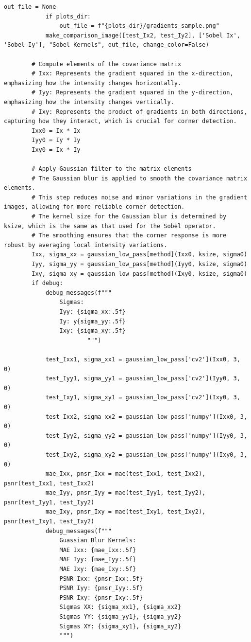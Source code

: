 \documentclass[11pt, conference, letterpaper]{IEEEtran}
\begin{document}
\begin{lstlisting}[style=python, caption={\texttt{shi\_tomasi\_corners.py}}, label={lst:stc}]
            out_file = None
            if plots_dir:
                out_file = f"{plots_dir}/gradients_sample.png"
            make_comparison_image([test_Ix2, test_Iy2], ['Sobel Ix', 'Sobel Iy'], "Sobel Kernels", out_file, change_color=False)
            
        # Compute elements of the covariance matrix
        # Ixx: Represents the gradient squared in the x-direction, emphasizing how the intensity changes horizontally.
        # Iyy: Represents the gradient squared in the y-direction, emphasizing how the intensity changes vertically.
        # Ixy: Represents the product of gradients in both directions, capturing how they interact, which is crucial for corner detection.
        Ixx0 = Ix * Ix
        Iyy0 = Iy * Iy
        Ixy0 = Ix * Iy
    
        # Apply Gaussian filter to the matrix elements
        # The Gaussian blur is applied to smooth the covariance matrix elements. 
        # This step reduces noise and minor variations in the gradient images, allowing for more reliable corner detection. 
        # The kernel size for the Gaussian blur is determined by ksize, which is the same as that used for the Sobel operator. 
        # The smoothing ensures that the corner response is more robust by averaging local intensity variations.
        Ixx, sigma_xx = gaussian_low_pass[method](Ixx0, ksize, sigma0)
        Iyy, sigma_yy = gaussian_low_pass[method](Iyy0, ksize, sigma0)
        Ixy, sigma_xy = gaussian_low_pass[method](Ixy0, ksize, sigma0)
        if debug:
            debug_messages(f"""
                Sigmas: 
                Iyy: {sigma_xx:.5f}
                Iy: y{sigma_yy:.5f}
                Ixy: {sigma_xy:.5f}
                        """)
     
            test_Ixx1, sigma_xx1 = gaussian_low_pass['cv2'](Ixx0, 3, 0)
            test_Iyy1, sigma_yy1 = gaussian_low_pass['cv2'](Iyy0, 3, 0)
            test_Ixy1, sigma_xy1 = gaussian_low_pass['cv2'](Ixy0, 3, 0)
            test_Ixx2, sigma_xx2 = gaussian_low_pass['numpy'](Ixx0, 3, 0)
            test_Iyy2, sigma_yy2 = gaussian_low_pass['numpy'](Iyy0, 3, 0)
            test_Ixy2, sigma_xy2 = gaussian_low_pass['numpy'](Ixy0, 3, 0)
            mae_Ixx, pnsr_Ixx = mae(test_Ixx1, test_Ixx2), psnr(test_Ixx1, test_Ixx2)
            mae_Iyy, pnsr_Iyy = mae(test_Iyy1, test_Iyy2), psnr(test_Iyy1, test_Iyy2)
            mae_Ixy, pnsr_Ixy = mae(test_Ixy1, test_Ixy2), psnr(test_Ixy1, test_Ixy2)
            debug_messages(f"""
                Guassian Blur Kernels:
                MAE Ixx: {mae_Ixx:.5f}
                MAE Iyy: {mae_Iyy:.5f}
                MAE Ixy: {mae_Ixy:.5f}
                PSNR Ixx: {pnsr_Ixx:.5f}
                PSNR Iyy: {pnsr_Iyy:.5f}
                PSNR Ixy: {pnsr_Ixy:.5f}
                Sigmas XX: {sigma_xx1}, {sigma_xx2}
                Sigmas YY: {sigma_yy1}, {sigma_yy2}
                Sigmas XY: {sigma_xy1}, {sigma_xy2}
                """)
    

\end{lstlisting}
\end{document}
